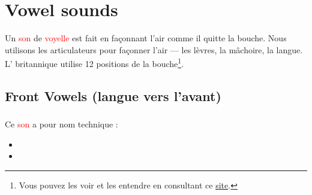 \chapter{Vowel sounds}\label{chap:vow}



Un \textcolor{red}{son} de \textcolor{red}{voyelle}
est fait en façonnant l'air comme il quitte la
bouche. Nous utilisons les articulateurs pour façonner l'air --- les
lèvres, la mâchoire, la langue. L' britannique utilise
12 positions de la bouche\footnote{Vous pouvez les voir et les
  entendre en consultant ce \href{https://pronunciationstudio.com/vowel02/}{site}.}.

\newpage
\minitoc
\newpage

\section{Front Vowels (langue vers l'avant)}\label{sec:frontvow}


\newpage


\subsection{}\label{subsec:ilong}

Ce \textcolor{red}{son} a pour nom technique :

\begin{itemize}
\item {}
\item {}
\end{itemize}

\indicsound


